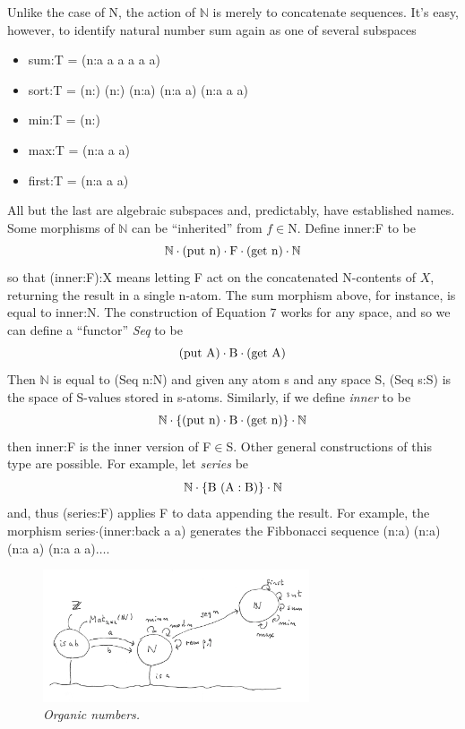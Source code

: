 \documentclass[11pt]{article}
\begin{document}
Unlike the case of N, the action of ${\mathbb N}$ is merely to concatenate sequences.  It's easy, however, to identify 
natural number sum again as one of several subspaces 
\begin{itemize}
\item sum:T = (n:a a a a a a)
\item sort:T = (n:) (n:) (n:a) (n:a a) (n:a a a)
\item min:T = (n:)
\item max:T = (n:a a a)
\item first:T = (n:a a a)
\end{itemize} 
All but the last are algebraic subspaces and, predictably, have established names.  
Some morphisms of ${\mathbb N}$ can be ``inherited'' from $f\in$N.  Define inner:F to be 
\begin{equation}
{\mathbb N}\cdot({\rm put\ n})\cdot {\rm F}\cdot({\rm get\ n})\cdot{\mathbb N}
\end{equation}
so that (inner:F):X means letting F act on the concatenated N-contents of $X$, returning the result in a single n-atom.  The sum morphism 
above, for instance, is equal to inner:N.  The construction of Equation 7 works for any space, and so we can define a ``functor'' {\it Seq} to be 
\begin{equation}
({\rm put}\ {\rm A})\cdot {\rm B} \cdot ({\rm get}\ {\rm A})
\end{equation}
Then {$\mathbb N$} is equal to (Seq n:N) and given any atom s and any space S, (Seq s:S) is the space of S-values stored in s-atoms.  
Similarly, if we define {\it inner} to be  
\begin{equation}
{\mathbb N}\cdot\{({\rm put\ n})\cdot{\rm B}\cdot({\rm get\ n})\}\cdot{\mathbb N}
\end{equation}
then inner:F is the inner version of F$\in$S.  Other general constructions of this type are possible.  For example, let {\it series} be 
\begin{equation}
{\mathbb N}\cdot\{{\rm B\ (A:B)}\}\cdot{\mathbb N} 
\end{equation}
and, thus (series:F) applies F to data appending the result.  For example, the morphism series$\cdot$(inner:back a a)
generates the Fibbonacci sequence (n:a) (n:a) (n:a a) (n:a a a)$\dots$.

\begin{figure}[h]
\centering
\includegraphics[width=0.7\textwidth]{organics.png}
\caption{{\it Organic numbers.}}
\end{figure}
\end{document}
